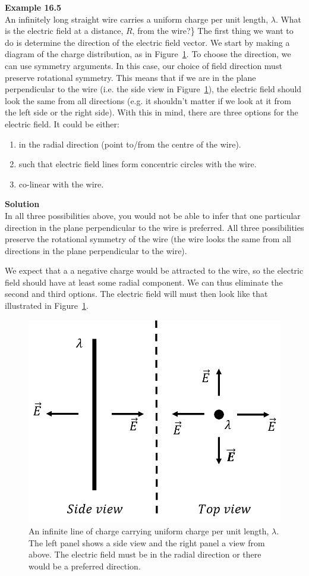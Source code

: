 \begin{framed}
\textbf{Example 16.5}\\
An infinitely long straight wire carries a uniform charge per unit length, $\lambda$. What is the electric field at a distance, $R$, from the wire?\}
The first thing we want to do is determine the direction of the electric field vector. We start by making a diagram of the charge distribution, as in Figure~\ref{fig:gauss:linecharge}. To choose the direction, we can use symmetry arguments. In this case,  our choice of field direction must preserve rotational symmetry. This means that if we are in the plane perpendicular to the wire (i.e. the side view in Figure~\ref{fig:gauss:linecharge}), the electric field should look the same from all directions (e.g. it shouldn't matter if we look at it from the left side or the right side). With this in mind, there are three options for the electric field. It could be either:

\begin{enumerate}
\item in the radial direction (point to/from the centre of the wire).
\item such that electric field lines form concentric circles with the wire.
\item co-linear with the wire.
\end{enumerate}

\begin{framed}
\textbf{Solution}\\
In all three possibilities above, you would not be able to infer that one particular direction in the plane perpendicular to the wire is preferred. All three possibilities preserve the rotational symmetry of the wire (the wire looks the same from all directions in the plane perpendicular to the wire).

We expect that a a negative charge would be attracted to the wire, so the electric field should have at least some radial component. We can thus eliminate the second and third options. The electric field will must then look like that illustrated in Figure~\ref{fig:gauss:linecharge}.

\begin{figure}[!htbp]
\centering
\includegraphics[width=0.4\linewidth]{files/linecharge-4014db5a513bae16bff2ff03bbbcfb09.png}
\caption[]{An infinite line of charge carrying uniform charge per unit length, $\lambda$. The left panel shows a side view and the right panel a view from above. The electric field must be in the radial direction or there would be a preferred direction.}
\label{fig:gauss:linecharge}
\end{figure}


\end{framed}
\end{framed}
